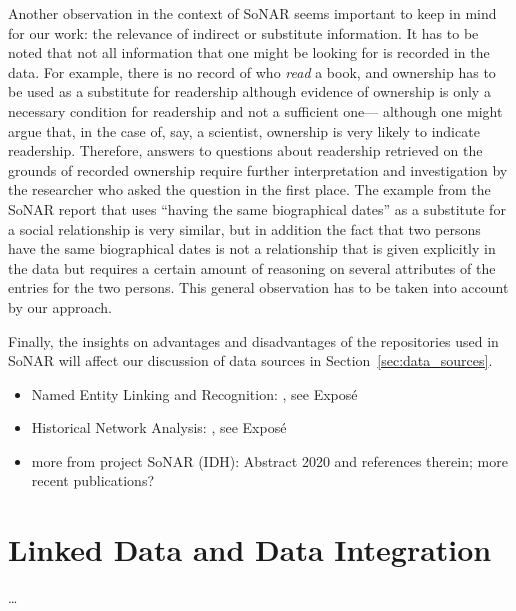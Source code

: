 Another observation in the context of SoNAR seems important to keep in mind
for our work: the relevance of indirect or substitute information.
It has to be noted that not all information that one might be looking for is recorded
in the data. For example, there is no record of who \emph{read} a book,
and ownership has to be used as a substitute for readership although evidence
of ownership is only a necessary condition for readership and not a sufficient one---%
although one might argue that, in the case of, say, a scientist, ownership is very likely
to indicate readership.
Therefore, answers to questions
about readership retrieved on the grounds of recorded ownership require further interpretation and investigation
by the researcher who asked the question in the first place.
The example from the SoNAR report that uses \enquote{having the same biographical dates}
as a substitute for a social relationship is very similar, but in addition
the fact that two persons have the same biographical dates is not a relationship that is
given explicitly in the data but requires a certain amount of reasoning on several attributes of the entries
for the two persons.
This general observation has to be taken into account by our approach.

Finally, the insights on advantages and disadvantages of the repositories used in SoNAR
will affect our discussion of data sources in Section~\ref{sec:data_sources}.



\begin{itemize}
  \item
    Named Entity Linking and Recognition: \autocite{Menzel2021, Meiners2022}, see Exposé
  \item 
    Historical Network Analysis: \autocite{Menzel2020}, see Exposé
  \item
    more from project SoNAR (IDH): Abstract 2020 and references therein; more recent publications?
\end{itemize}


\section{Linked Data and Data Integration}
\label{sec:linked_data+integration}

\dots


